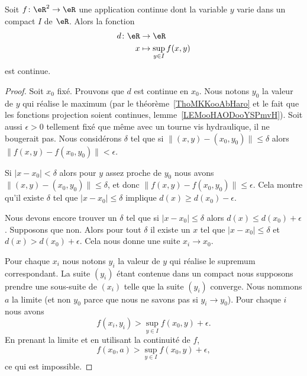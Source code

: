 \begin{proposition}      \label{PROPooWXBAooAEweSF}
    Soit \( f\colon \eR^2\to \eR\) une application continue dont la variable \( y\) varie dans un compact \( I\) de \( \eR\). Alors la fonction
    \begin{equation}
        \begin{aligned}
            d\colon \eR&\to \eR \\
            x&\mapsto \sup_{y\in I} f(x,y)
        \end{aligned}
    \end{equation}
    est continue.
\end{proposition}

\begin{proof}
    Soit \( x_0\) fixé. Prouvons que \( d\) est continue en \( x_0\). Nous notons \( y_0\) la valeur de \( y\) qui réalise le maximum (par le théorème~\ref{ThoMKKooAbHaro} et le fait que les fonctions projection soient continues, lemme~\ref{LEMooHAODooYSPmvH}). Soit aussi \( \epsilon>0\) tellement fixé que même avec un tourne vis hydraulique, il ne bougerait pas. Nous considérons \( \delta\) tel que si \( \| (x,y)-(x_0,y_0) \|\leq \delta\) alors \( \| f(x,y)-f(x_0,y_0) \|<\epsilon\).

    Si \( | x-x_0 |<\delta\) alors pour \( y\) assez proche de \( y_0\) nous avons \( \| (x,y)-(x_0,y_0) \|\leq \delta\), et donc \( \| f(x,y)-f(x_0,y_0) \|\leq \epsilon \). Cela montre qu'il existe \( \delta\) tel que \( | x-x_0 |\leq \delta\) implique \( d(x)\geq d(x_0)-\epsilon\).

    Nous devons encore trouver un \( \delta\) tel que si \( | x-x_0 |\leq \delta\) alors \( d(x)\leq d(x_0)+\epsilon\). Supposons que non. Alors pour tout \( \delta\) il existe un \( x\) tel que \( | x-x_0 |\leq \delta\) et \( d(x)> d(x_0)+\epsilon\). Cela nous donne une suite \( x_i\to x_0\).

    Pour chaque \( x_i\) nous notons \( y_i\) la valeur de \( y\) qui réalise le supremum correspondant. La suite \( (y_i)\) étant contenue dans un compact nous supposons prendre une sous-suite de \( (x_i)\) telle que la suite \( (y_i)\) converge. Nous nommons \( a\) la limite (et non \( y_0\) parce que nous ne savons pas si \( y_i\to y_0\)). Pour chaque \( i\) nous avons
    \begin{equation}
        f(x_i,y_i)>\sup_{y\in I}f(x_0,y)+\epsilon.
    \end{equation}
    En prenant la limite et en utilisant la continuité de \( f\),
    \begin{equation}
        f(x_0,a)>\sup_{y\in I} f(x_0,y)+\epsilon,
    \end{equation}
    ce qui est impossible.
\end{proof}

